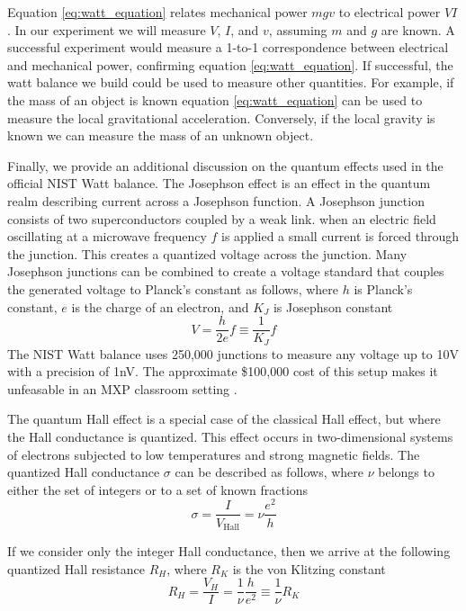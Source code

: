 \documentclass[aps,prstab,reprint,12pt]{revtex4-1}
\begin{document}
Equation \ref{eq:watt_equation} relates mechanical power $mgv$ to electrical power $VI$. In our experiment we will measure $V$, $I$, and $v$, assuming $m$ and $g$ are known.
A successful experiment would measure a 1-to-1 correspondence between electrical and mechanical power, confirming equation \ref{eq:watt_equation}. If successful, the watt balance we build could be used to measure other quantities. For example, if the mass of an object is known equation \ref{eq:watt_equation} can be used to measure the local gravitational acceleration. Conversely, if the local gravity is known we can measure the mass of an unknown object.

Finally, we provide an additional discussion on the quantum effects used in the official NIST Watt balance. 
The Josephson effect is an effect in the quantum realm describing current across a Josephson function. A Josephson junction consists of two superconductors coupled by a weak link. when an electric field oscillating at a microwave frequency  $f$ is applied a small current is forced through the junction. This creates a quantized voltage across the junction. Many Josephson junctions can be combined to create a voltage standard that couples the generated voltage to Planck's constant as follows, where $h$ is Planck's constant, $e$ is the charge of an electron, and $K_J$ is Josephson constant
\begin{equation}\label{eq:josephson}
    V=\frac{h}{2e}f \equiv \frac{1}{K_J} f
\end{equation}
The NIST Watt balance uses 250,000 junctions to measure any voltage up to 10\si{V} with a precision of 1\si{nV}. The approximate \$100,000 cost of this setup makes it unfeasable in an MXP classroom setting \cite{Chao2015}.

The quantum Hall effect is a special case of the classical Hall effect, but where the Hall conductance is quantized. This effect occurs in two-dimensional systems of electrons subjected to low temperatures and strong magnetic fields. The quantized Hall conductance $\sigma$ can be described as follows, where $\nu$ belongs to either the set of integers or to a set of known fractions
\begin{equation}
    \sigma = \frac{I}{V_\mathrm{Hall}} = \nu \frac{e^2}{h}
\end{equation}

If we consider only the integer Hall conductance, then we arrive at the following quantized Hall resistance $R_H$, where $R_K$ is the von Klitzing constant
\begin{equation}\label{eq:resistance}
    R_H=\frac{V_H}{I}=\frac{1}{\nu}\frac{h}{e^2} \equiv \frac{1}{\nu} R_K
\end{equation}
\end{document}
